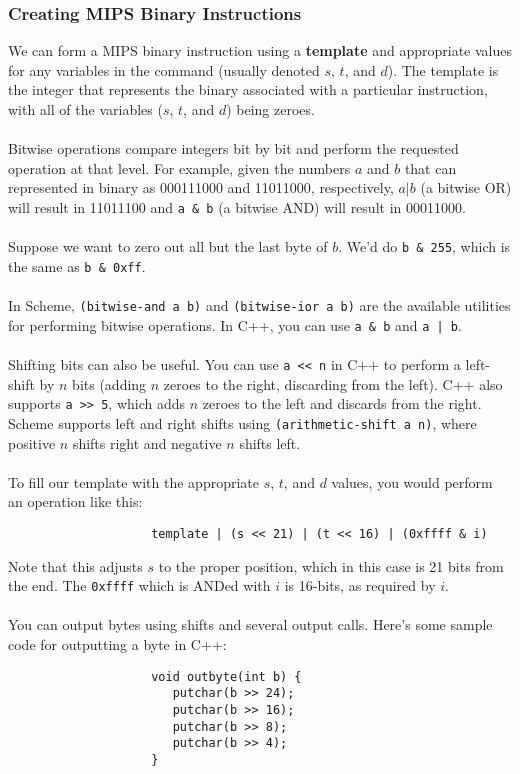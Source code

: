 \documentclass[]{article}
\theoremstyle{definition}
\begin{document}
			\subsubsection{Creating MIPS Binary Instructions}
				We can form a MIPS binary instruction using a \textbf{template} and appropriate values for any variables in the command (usually denoted $s$, $t$, and $d$). The template is the integer that represents the binary associated with a particular instruction, with all of the variables ($s$, $t$, and $d$) being zeroes. 
				\\ \\
				Bitwise operations compare integers bit by bit and perform the requested operation at that level. For example, given the numbers $a$ and $b$ that can represented in binary as 000111000 and 11011000, respectively, $a | b$ (a bitwise OR) will result in 11011100 and \verb+a & b+ (a bitwise AND) will result in 00011000. 
				\\ \\
				Suppose we want to zero out all but the last byte of $b$. We'd do \verb+b & 255+, which is the same as \verb+b & 0xff+.
				\\ \\
				In Scheme, \verb+(bitwise-and a b)+ and \verb+(bitwise-ior a b)+ are the available utilities for performing bitwise operations. In C++, you can use \verb+a & b+ and \verb+a | b+.
				\\ \\
				Shifting bits can also be useful. You can use \verb+a << n+ in C++ to perform a left-shift by $n$ bits (adding $n$ zeroes to the right, discarding from the left). C++ also supports \verb+a >> 5+, which adds $n$ zeroes to the left and discards from the right. Scheme supports left and right shifts using \verb+(arithmetic-shift a n)+, where positive $n$ shifts right and negative $n$ shifts left.
				\\ \\
				To fill our template with the appropriate $s$, $t$, and $d$ values, you would perform an operation like this:
				\begin{verbatim}
					template | (s << 21) | (t << 16) | (0xffff & i)
				\end{verbatim}
				Note that this adjusts $s$ to the proper position, which in this case is 21 bits from the end. The \verb+0xffff+ which is ANDed with $i$ is 16-bits, as required by $i$.
				\\ \\
				You can output bytes using shifts and several output calls. Here's some sample code for outputting a byte in C++:
				\begin{verbatim}
					void outbyte(int b) {
					   putchar(b >> 24);
					   putchar(b >> 16);
					   putchar(b >> 8);
					   putchar(b >> 4);
					}
				\end{verbatim}
\end{document}
